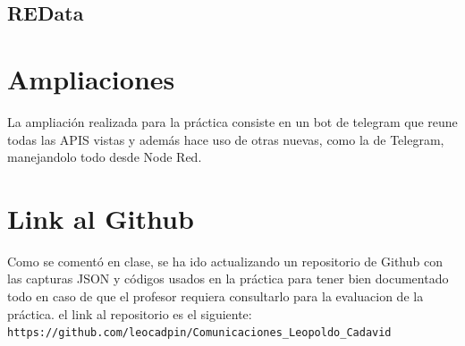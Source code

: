 \documentclass[12pt]{article}
\begin{document}
\subsection{REData}

\section{Ampliaciones}

La ampliación realizada para la práctica consiste en un bot de telegram que reune todas las APIS vistas y además hace uso de otras nuevas, como la de Telegram, 
manejandolo todo desde Node Red. 

\section{Link al Github}
Como se comentó en clase, se ha ido actualizando un repositorio de Github con las capturas JSON y códigos usados en la práctica para tener bien documentado todo en caso de que el profesor
requiera consultarlo para la evaluacion de la práctica. el link al repositorio es el siguiente:\\

\verb|https://github.com/leocadpin/Comunicaciones_Leopoldo_Cadavid|
\end{document}

